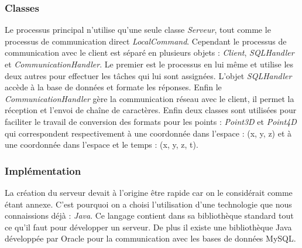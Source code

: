 \subsubsection{Classes}
Le processus principal n'utilise qu'une seule classe \emph{Serveur}, tout comme le processus de communication direct \emph{LocalCommand}.
Cependant le processus de communication avec le client est séparé en plusieurs objets : \emph{Client}, \emph{SQLHandler} et \emph{CommunicationHandler}. 
Le premier est le processus en lui même et utilise les deux autres pour effectuer les tâches qui lui sont assignées. L'objet \emph{SQLHandler} accède à la base de données et formate les réponses.
Enfin le \emph{CommunicationHandler} gère la communication réseau avec le client, il permet la réception et l'envoi de chaîne de caractères.
Enfin deux classes sont utilisées pour faciliter le travail de conversion des formats pour les points : \emph{Point3D} et \emph{Point4D} qui correspondent respectivement à une coordonnée dans l'espace : (x, y, z)
et à une coordonnée dans l'espace et le temps : (x, y, z, t).

\subsubsection{Implémentation}
La création du serveur devait à l'origine être rapide car on le considérait comme étant annexe. C'est pourquoi on a choisi l'utilisation d'une
technologie que nous connaissions déjà : \emph{Java}. Ce langage contient dans sa bibliothèque standard tout ce qu'il faut pour développer un serveur.
De plus il existe une bibliothèque Java développée par Oracle pour la communication avec les bases de données MySQL.

